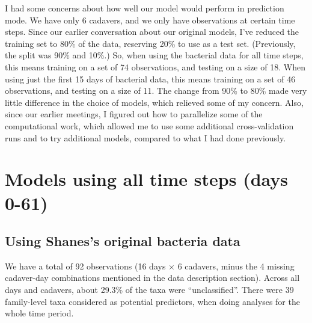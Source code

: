 \documentclass{article}
\begin{document}

I had some concerns about how well our model would perform in
prediction mode.  We have only 6 cadavers, and we only have
observations at certain time steps.  Since our earlier conversation
about our original models, I've reduced the training set to 80\% of
the data, reserving 20\% to use as a test set.  (Previously, the split
was 90\% and 10\%.)  So, when using the bacterial data for all time
steps, this means training on a set of 74 observations, and testing on
a size of 18.  When using just the first 15 days of bacterial data,
this means training on a set of 46 observations, and testing on a size
of 11.  The change from 90\% to 80\% made very little difference in
the choice of models, which relieved some of my concern.  Also, since our
earlier meetings, I figured out how to parallelize some of the
computational work, which allowed me to use some additional
cross-validation runs and to try additional models, compared to what I
had done previously.



\section{Models using all time steps (days 0-61)}


\subsection{Using Shanes's original bacteria data}

We have a total of 92 observations (16 days $\times$ 6 cadavers, minus
the 4 missing cadaver-day combinations mentioned in the data
description section).  Across all days and cadavers, about 29.3\% of
the taxa were ``unclassified''.  There were 39 family-level taxa
considered as potential predictors, when doing analyses for the whole
time period.
\end{document}
